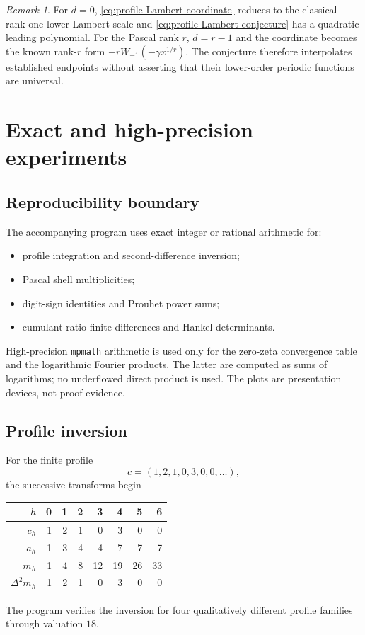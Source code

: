 \documentclass[11pt]{article}
\numberwithin{equation}{section}
\theoremstyle{definition}
\theoremstyle{remark}
\newtheorem{remark}[theorem]{Remark}
\begin{document}
\begin{remark}
For $d=0$, \eqref{eq:profile-Lambert-coordinate} reduces to the classical
rank-one lower-Lambert scale and \eqref{eq:profile-Lambert-conjecture} has a
quadratic leading polynomial.  For the Pascal rank $r$, $d=r-1$ and the
coordinate becomes the known rank-$r$ form
$-rW_{-1}(-\gamma x^{1/r})$.  The conjecture therefore interpolates established
endpoints without asserting that their lower-order periodic functions are
universal.
\end{remark}

\section{Exact and high-precision experiments}
\label{sec:experiments}

\subsection{Reproducibility boundary}

The accompanying program  uses exact integer
or rational arithmetic for:
\begin{itemize}[leftmargin=*]
\item profile integration and second-difference inversion;
\item Pascal shell multiplicities;
\item digit-sign identities and Prouhet power sums;
\item cumulant-ratio finite differences and Hankel determinants.
\end{itemize}
High-precision \texttt{mpmath} arithmetic is used only for the zero-zeta
convergence table and the logarithmic Fourier products.  The latter are
computed as sums of logarithms; no underflowed direct product is used.  The
plots are presentation devices, not proof evidence.

\subsection{Profile inversion}

For the finite profile
\begin{equation}
 c=(1,2,1,0,3,0,0,\ldots),
\end{equation}
the successive transforms begin
\begin{center}
\begin{tabular}{@{}rrrrrrrr@{}}
\toprule
$h$ & 0 & 1 & 2 & 3 & 4 & 5 & 6 \\
\midrule
$c_h$ & 1 & 2 & 1 & 0 & 3 & 0 & 0 \\
$a_h$ & 1 & 3 & 4 & 4 & 7 & 7 & 7 \\
$m_h$ & 1 & 4 & 8 & 12 & 19 & 26 & 33 \\
$\Delta^2m_h$ & 1 & 2 & 1 & 0 & 3 & 0 & 0 \\
\bottomrule
\end{tabular}
\end{center}
The program verifies the inversion for four qualitatively different profile
families through valuation $18$.
\end{document}
